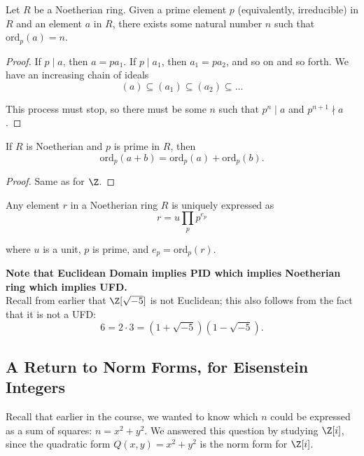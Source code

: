 \documentclass[11pt]{article}
\begin{document}
\begin{lemma}
Let $R$ be a Noetherian ring. Given a prime element $p$ (equivalently, irreducible) in $R$ and an element $a$ in $R$, there exists some natural number $n$ such that 
$\mathrm{ord}_p(a) = n$. 
\end{lemma}

\begin{proof}
If $p \mid a$, then $a = pa_1$. If $p \mid a_1$, then $a_1 = pa_2$, and so on and so forth. We have an increasing chain of ideals
\[
    (a) \subseteq (a_1) \subseteq (a_2) \subseteq \dots
\]    

This process must stop, so there must be some $n$ such that $p^n \mid a$ and $p^{n+1} \nmid a$.
\end{proof}

\begin{lemma}
If $R$ is Noetherian and $p$ is prime in $R$, then 
\[
    \mathrm{ord}_p(a+b) = \mathrm{ord}_p(a) + \mathrm{ord}_p(b).   
\]
\end{lemma}

\begin{proof}
Same as for $\Z$.
\end{proof}


\begin{theorem}
Any element $r$ in a Noetherian ring $R$ is uniquely expressed as 
\[
    r = u \prod_p p^{e_{p}}
\]

where $u$ is a unit, $p$ is prime, and $e_p = \mathrm{ord}_p(r).$ 
\end{theorem}

\begin{remark}
\textbf{Note that Euclidean Domain implies PID which implies Noetherian ring which implies UFD.} \\

Recall from earlier that $\Z[\sqrt{-5}]$ is not Euclidean; this also follows from the fact that it is not a UFD: 
\[
    6 = 2 \cdot 3 = (1+\sqrt{-5})(1-\sqrt{-5}).
\]
\end{remark}

\subsection{A Return to Norm Forms, for Eisenstein Integers}

Recall that earlier in the course, we wanted to know which $n$ could be expressed as a sum of squares: $n = x^2 + y^2$.
We answered this question by studying $\Z[i]$, since the quadratic form $Q(x, y) = x^2 + y^2$ is the norm form for $\Z[i]$. \\
\end{document}
